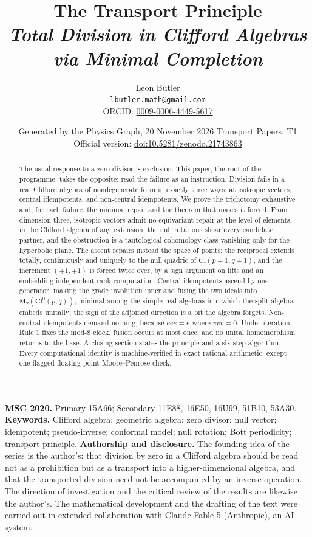 \documentclass[11pt]{article}
\title{\bfseries The Transport Principle\\[4pt]\large\itshape Total Division in Clifford Algebras via Minimal Completion}
\author{Leon Butler\\ \normalsize\href{mailto:lbutler.math@gmail.com}{\texttt{lbutler.math@gmail.com}}\\ \normalsize ORCID: \href{https://orcid.org/0009-0006-4449-5617}{0009-0006-4449-5617}}
\date{Generated by the Physics Graph, 20 November 2026 \textperiodcentered{} Transport Papers, T1\\[3pt]\small Official version: \href{https://doi.org/10.5281/zenodo.21743863}{doi:10.5281/zenodo.21743863}}
\theoremstyle{definition}
\theoremstyle{plain}
\providecommand{\Cl}{}\renewcommand{\Cl}{\mathrm{Cl}}
\providecommand{\Mat}{}\renewcommand{\Mat}{\mathrm{M}}
\begin{document}
\maketitle
\begin{abstract}
\normalsize
The usual response to a zero divisor is exclusion. This paper, the root of the programme, takes the opposite: read the failure as an instruction. Division fails in a real Clifford algebra of nondegenerate form in exactly three ways: at isotropic vectors, central idempotents, and non-central idempotents. We prove the trichotomy exhaustive and, for each failure, the minimal repair and the theorem that makes it forced. From dimension three, isotropic vectors admit no equivariant repair at the level of elements, in the Clifford algebra of any extension: the null rotations shear every candidate partner, and the obstruction is a tautological cohomology class vanishing only for the hyperbolic plane. The ascent repairs instead the space of points: the reciprocal extends totally, continuously and uniquely to the null quadric of $\Cl(p{+}1,q{+}1)$, and the increment $(+1,+1)$ is forced twice over, by a sign argument on lifts and an embedding-independent rank computation. Central idempotents ascend by one generator, making the grade involution inner and fusing the two ideals into $\Mat_2(\Cl^0(p,q))$, minimal among the simple real algebras into which the split algebra embeds unitally; the sign of the adjoined direction is a bit the algebra forgets. Non-central idempotents demand nothing, because $eee = e$ where $vvv = 0$. Under iteration, Rule 1 fixes the mod-8 clock, fusion occurs at most once, and no unital homomorphism returns to the base. A closing section states the principle and a six-step algorithm. Every computational identity is machine-verified in exact rational arithmetic, except one flagged floating-point Moore--Penrose check.
\end{abstract}
\medskip
\noindent\textbf{MSC 2020.} Primary 15A66; Secondary 11E88, 16E50, 16U99, 51B10, 53A30.\\
\textbf{Keywords.} Clifford algebra; geometric algebra; zero divisor; null vector; idempotent; pseudo-inverse; conformal model; null rotation; Bott periodicity; transport principle.
\newpage
\noindent \textbf{Authorship and disclosure. }The founding idea of the series is the author's: that division by zero in a Clifford algebra should be read not as a prohibition but as a transport into a higher-dimensional algebra, and that the transported division need not be accompanied by an inverse operation. The direction of investigation and the critical review of the results are likewise the author's. The mathematical development and the drafting of the text were carried out in extended collaboration with Claude Fable 5 (Anthropic), an AI system.
\end{document}
